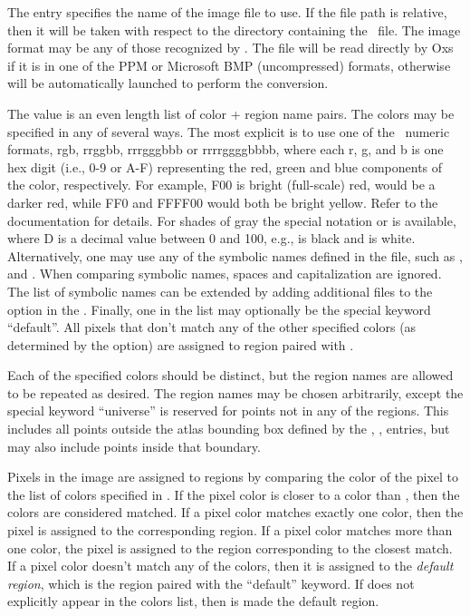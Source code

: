 \begin{description}
The  entry specifies the name of the image file to use.
If the file path is relative, then it will be taken with respect to the
directory containing the \MIF\ file.  The image format may be any of
those recognized by .  The file will be read directly by Oxs if it
is in one of the PPM or Microsoft BMP (uncompressed) formats, otherwise
 will be automatically launched to perform the conversion.

The  value is an even length list of color + region
name pairs.  The colors may be specified in any of several ways.  The
most explicit is to use one of the \Tk\ numeric formats,
\lb rgb, \lb rrggbb, \lb rrrgggbbb or \lb rrrrggggbbbb, where
each r, g, and b is one hex digit (i.e., 0-9 or A-F) representing the
red, green and blue components of the color, respectively.  For example,
\lb F00 is bright (full-scale) red,  would be a darker red, while
\lb FF0 and \lb FFFF00 would both be bright yellow.  Refer to the
 documentation for details.  For shades of gray the
special notation  or  is available, where D is a
decimal value between 0 and 100, e.g.,  is black and
 is white.  Alternatively, one may use any of the symbolic
names defined in the  file, such as
,  and .  When comparing symbolic names,
spaces and capitalization are ignored.  The list of symbolic names can
be extended by adding additional files to the  option
in the  .  Finally, one  in the
 list may optionally be the special keyword ``default''.
All pixels that don't match any of the other specified colors (as
determined by the  option) are assigned to region
paired with .

Each of the specified colors should be distinct, but the region names
are allowed to be repeated as desired.  The region names may be chosen
arbitrarily, except the special keyword ``universe'' is reserved for
points not in any of the regions.  This includes all points outside the
atlas bounding box defined by the , , 
entries, but may also include points inside that boundary.

Pixels in the image are assigned to regions by comparing the color of
the pixel to the list of colors specified in .  If the
pixel color is closer to a  color than
, then the colors are considered matched.
If a pixel color matches exactly one  color, then the pixel
is assigned to the corresponding region.  If a pixel color matches more
than one  color, the pixel is assigned to the region
corresponding to the closest match.  If a pixel color doesn't match any
of the  colors, then it is assigned to the \textit{default
region}, which is the region paired with the ``default'' keyword.  If
 does not explicitly appear in the  colors
list, then  is made the default region.


\end{description}
